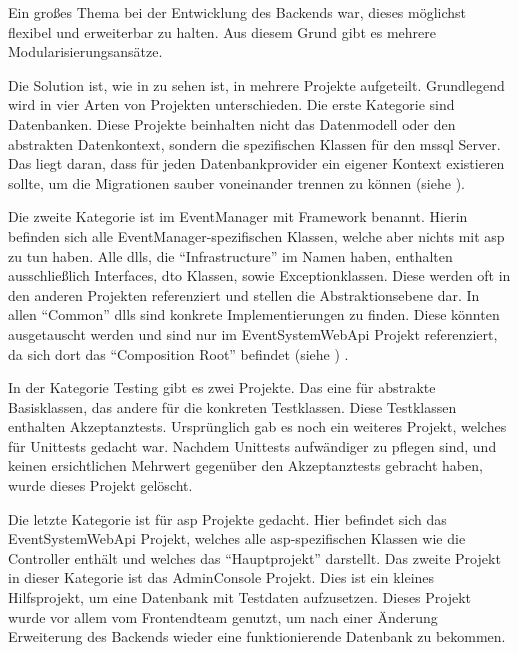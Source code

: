 
Ein großes Thema bei der Entwicklung des Backends war, dieses möglichst flexibel und erweiterbar zu halten. Aus diesem Grund gibt es mehrere Modularisierungsansätze.

Die Solution ist, wie in  zu sehen ist, in mehrere Projekte aufgeteilt. Grundlegend wird in vier Arten von Projekten unterschieden. Die erste Kategorie sind Datenbanken. Diese Projekte beinhalten nicht das Datenmodell oder den abstrakten Datenkontext, sondern die spezifischen Klassen für \zB den \gls{mssql} Server. Das liegt daran, dass für jeden Datenbankprovider ein eigener Kontext existieren sollte, um die Migrationen sauber voneinander trennen zu können (siehe ).


Die zweite Kategorie ist im EventManager mit Framework benannt. Hierin befinden sich alle EventManager-spezifischen Klassen, welche aber nichts mit \gls{asp} zu tun haben. Alle \gls{dll}s, die \enquote{Infrastructure} im Namen haben, enthalten ausschließlich Interfaces, \gls{dto} Klassen, sowie Exceptionklassen. Diese werden oft in den anderen Projekten referenziert und stellen die Abstraktionsebene dar. In allen \enquote{Common} \gls{dll}s sind konkrete Implementierungen zu finden. Diese könnten ausgetauscht werden und sind nur im EventSystemWebApi Projekt referenziert, da sich dort das \enquote{Composition Root} befindet (siehe ) \cite{compRoot}.

In der Kategorie Testing gibt es zwei Projekte. Das eine für abstrakte Basisklassen, das andere für die konkreten Testklassen. Diese Testklassen enthalten Akzeptanztests. Ursprünglich gab es noch ein weiteres Projekt, welches für Unittests gedacht war. Nachdem Unittests aufwändiger zu pflegen sind, und keinen ersichtlichen Mehrwert gegenüber den Akzeptanztests gebracht haben, wurde dieses Projekt gelöscht.

Die letzte Kategorie ist für \gls{asp} Projekte gedacht. Hier befindet sich das EventSystemWebApi Projekt, welches alle \gls{asp}-spezifischen Klassen wie \zB die Controller enthält und welches das \enquote{Hauptprojekt} darstellt. Das zweite Projekt in dieser Kategorie ist das AdminConsole Projekt. Dies ist ein kleines Hilfsprojekt, um eine Datenbank mit Testdaten aufzusetzen. Dieses Projekt wurde vor allem vom Frontendteam genutzt, um nach einer Änderung \bzw Erweiterung des Backends wieder eine funktionierende Datenbank zu bekommen.

